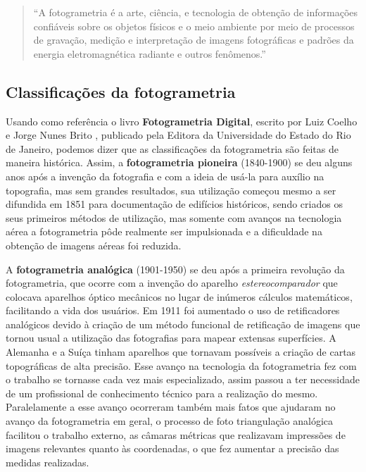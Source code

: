 \begin{quote}
	``A fotogrametria é a arte, ciência, e tecnologia de obtenção de informações confiáveis sobre os objetos físicos e o meio ambiente por meio de processos de gravação, medição e interpretação de imagens fotográficas e padrões da energia eletromagnética radiante e outros fenômenos.''
\end{quote}

\subsection{Classificações da fotogrametria}
Usando como referência o  livro \textbf{Fotogrametria Digital}, escrito por Luiz Coelho e Jorge Nunes Brito \cite{bib:livrofotogrametria}, publicado pela Editora da Universidade do Estado do Rio de Janeiro, podemos dizer que as classificações da fotogrametria são feitas de maneira histórica. Assim, a \textbf{fotogrametria pioneira} (1840-1900) se deu alguns anos após a invenção da fotografia e com a ideia de usá-la para auxílio na topografia, mas sem grandes resultados, sua utilização começou mesmo a ser difundida em 1851 para documentação de edifícios históricos, sendo criados os seus primeiros métodos de utilização, mas somente com avanços na tecnologia aérea a fotogrametria pôde realmente ser impulsionada e a dificuldade na obtenção de imagens aéreas foi reduzida. 


A \textbf{fotogrametria analógica} (1901-1950) se deu após a primeira revolução da fotogrametria, que ocorre com a invenção do aparelho \textit{estereocomparador} que colocava aparelhos óptico mecânicos no lugar de inúmeros cálculos matemáticos, facilitando a vida dos usuários. Em 1911 foi aumentado o uso de retificadores analógicos devido à criação de um método funcional de retificação de imagens que tornou usual a utilização das fotografias para mapear extensas superfícies. A Alemanha e a Suíça tinham aparelhos que tornavam possíveis a criação de cartas topográficas de alta precisão. Esse avanço na tecnologia da fotogrametria fez com o trabalho se tornasse cada vez mais especializado, assim passou a ter necessidade de um profissional de conhecimento técnico para a realização do mesmo. Paralelamente a esse avanço ocorreram também mais fatos que ajudaram no avanço da fotogrametria em geral, o processo de foto triangulação analógica facilitou o trabalho externo, as câmaras métricas que realizavam impressões de imagens relevantes quanto às coordenadas, o que fez aumentar a precisão das medidas realizadas.

